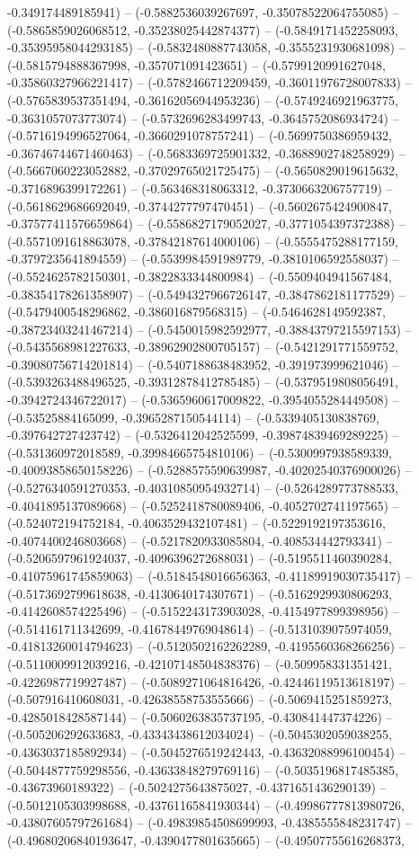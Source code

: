 -0.349174489185941) -- (-0.5882536039267697, -0.35078522064755085) -- (-0.5865859026068512, -0.35238025442874377) -- (-0.5849171452258093, -0.35395958044293185) -- (-0.5832480887743058, -0.3555231930681098) -- (-0.5815794888367998, -0.357071091423651) -- (-0.5799120991627048, -0.35860327966221417) -- (-0.5782466712209459, -0.36011976728007833) -- (-0.5765839537351494, -0.36162056944953236) -- (-0.5749246921963775, -0.3631057073773074) -- (-0.5732696283499743, -0.3645752086934724) -- (-0.5716194996527064, -0.3660291078757241) -- (-0.5699750386959432, -0.36746744671460463) -- (-0.5683369725901332, -0.3688902748258929) -- (-0.5667060223052882, -0.37029765021725475) -- (-0.5650829019615632, -0.3716896399172261) -- (-0.563468318063312, -0.3730663206757719) -- (-0.5618629686692049, -0.3744277797470451) -- (-0.5602675424900847, -0.37577411576659864) -- (-0.5586827179052027, -0.3771054397372388) -- (-0.5571091618863078, -0.37842187614000106) -- (-0.5555475288177159, -0.3797235641894559) -- (-0.5539984591989779, -0.3810106592558037) -- (-0.5524625782150301, -0.3822833344800984) -- (-0.5509404941567484, -0.38354178261358907) -- (-0.5494327966726147, -0.3847862181177529) -- (-0.5479400548296862, -0.386016879568315) -- (-0.5464628149592387, -0.38723403241467214) -- (-0.5450015982592977, -0.38843797215597153) -- (-0.5435568981227633, -0.38962902800705157) -- (-0.5421291771559752, -0.39080756714201814) -- (-0.5407188638483952, -0.391973999621046) -- (-0.5393263488496525, -0.39312878412785485) -- (-0.5379519808056491, -0.3942724346722017) -- (-0.5365960617009822, -0.3954055284449508) -- (-0.53525884165099, -0.3965287150544114) -- (-0.5339405130838769, -0.397642727423742) -- (-0.5326412042525599, -0.39874839469289225) -- (-0.531360972018589, -0.39984665754810106) -- (-0.5300997938589339, -0.40093858650158226) -- (-0.5288575590639987, -0.40202540376900026) -- (-0.5276340591270353, -0.40310850954932714) -- (-0.5264289773788533, -0.4041895137089668) -- (-0.5252418780089406, -0.4052702741197565) -- (-0.524072194752184, -0.4063529432107481) -- (-0.5229192197353616, -0.4074400246803668) -- (-0.5217820933085804, -0.408534442793341) -- (-0.5206597961924037, -0.4096396272688031) -- (-0.5195511460390284, -0.41075961745859063) -- (-0.5184548016656363, -0.41189919030735417) -- (-0.5173692799618638, -0.4130640174307671) -- (-0.5162929930806293, -0.4142608574225496) -- (-0.5152243173903028, -0.4154977899398956) -- (-0.514161711342699, -0.41678449769048614) -- (-0.5131039075974059, -0.41813260014794623) -- (-0.5120502162262289, -0.4195560368266256) -- (-0.5110009912039216, -0.42107148504838376) -- (-0.509958331351421, -0.4226987719927487) -- (-0.5089271064816426, -0.42446119513618197) -- (-0.507916410608031, -0.42638558753555666) -- (-0.5069415251859273, -0.4285018428587144) -- (-0.5060263835737195, -0.430841447374226) -- (-0.505206292633683, -0.43343438612034024) -- (-0.5045302059038255, -0.4363037185892934) -- (-0.5045276519242443, -0.43632088996100454) -- (-0.5044877759298556, -0.43633848279769116) -- (-0.5035196817485385, -0.43673960189322) -- (-0.5024275643875027, -0.4371651436290139) -- (-0.5012105303998688, -0.43761165841930344) -- (-0.49986777813980726, -0.43807605797261684) -- (-0.49839854508699993, -0.4385555848231747) -- (-0.49680206840193647, -0.4390477801635665) -- (-0.49507755616268373, 